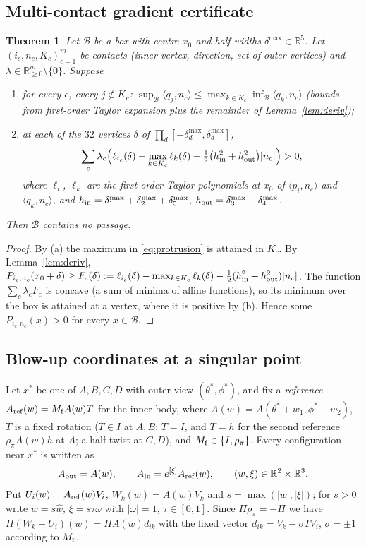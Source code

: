 \documentclass[11pt]{amsart}
\newtheorem{theorem}{Theorem}[section]
\theoremstyle{definition}
\newcommand{\R}{\mathbb{R}}
\newcommand{\Prj}{\Pi}
\newcommand{\ip}[2]{\langle #1,#2\rangle}
\newcommand{\abs}[1]{\lvert #1\rvert}
\begin{document}
\subsection{Multi-contact gradient certificate}
\begin{theorem}\label{thm:local5}
Let $\mathcal B$ be a box with centre $x_0$ and half-widths $\delta^{\max}\in\R^5$. Let $(i_c,n_c,K_c)_{c=1}^m$ be
contacts (inner vertex, direction, set of outer vertices) and $\lambda\in\R^m_{\ge0}\setminus\{0\}$. Suppose
\begin{enumerate}[label=(\alph*)]
\item for every $c$, every $j\notin K_c$: $\sup_{\mathcal B}\ip{q_j}{n_c}\le\max_{k\in K_c}\inf_{\mathcal B}\ip{q_k}{n_c}$
 (bounds from first-order Taylor expansion plus the remainder of Lemma~\ref{lem:deriv});
\item at each of the $32$ vertices $\delta$ of $\prod_d[-\delta^{\max}_d,\delta^{\max}_d]$,
\[
\sum_c\lambda_c\Bigl(\ell_{i_c}(\delta)-\max_{k\in K_c}\ell_{k}(\delta)-\tfrac12\bigl(h_{\rm in}^2+h_{\rm out}^2\bigr)\abs{n_c}\Bigr)>0,
\]
where $\ell_i$, $\ell_k$ are the first-order Taylor polynomials at $x_0$ of $\ip{p_i}{n_c}$ and $\ip{q_k}{n_c}$, and
$h_{\rm in}=\delta^{\max}_1+\delta^{\max}_2+\delta^{\max}_5$, $h_{\rm out}=\delta^{\max}_3+\delta^{\max}_4$.
\end{enumerate}
Then $\mathcal B$ contains no passage.
\end{theorem}
\begin{proof}
By (a) the maximum in \eqref{eq:protrusion} is attained in $K_c$. By Lemma~\ref{lem:deriv},
$P_{i_c,n_c}(x_0+\delta)\ge F_c(\delta):=\ell_{i_c}(\delta)-\max_{k\in K_c}\ell_k(\delta)-\tfrac12(h_{\rm in}^2+h_{\rm out}^2)\abs{n_c}$.
The function $\sum_c\lambda_cF_c$ is concave (a sum of minima of affine functions), so its minimum over the box is
attained at a vertex, where it is positive by (b). Hence some $P_{i_c,n_c}(x)>0$ for every $x\in\mathcal B$.
\end{proof}

\subsection{Blow-up coordinates at a singular point}
Let $x^*$ be one of $A,B,C,D$ with outer view $(\theta^*,\phi^*)$, and fix a \emph{reference} $A_{\rm ref}(w)=M_{\rm f}A(w)T$
for the inner body, where $A(w)=A(\theta^*+w_1,\phi^*+w_2)$, $T$ is a fixed rotation ($T\in I$ at $A,B$: $T=I$, and $T=h$ for the
second reference $\rho_\pi A(w)h$ at $A$; a half-twist at $C,D$), and $M_{\rm f}\in\{I,\rho_\pi\}$. Every configuration near $x^*$ is
written as
\[
A_{\rm out}=A(w),\qquad A_{\rm in}=e^{[\xi]}A_{\rm ref}(w),\qquad (w,\xi)\in\R^2\times\R^3 .
\]
Put $U_i(w)=A_{\rm ref}(w)V_i$, $W_k(w)=A(w)V_k$ and $s=\max(\abs w,\abs\xi)$; for $s>0$ write $w=s\hat w$, $\xi=s\tau\omega$
with $\abs\omega=1$, $\tau\in[0,1]$. Since $\Prj\rho_\pi=-\Prj$ we have $\Prj(W_k-U_i)(w)=\Prj A(w)d_{ik}$ with the fixed vector
$d_{ik}=V_k-\sigma TV_i$, $\sigma=\pm1$ according to $M_{\rm f}$.
\end{document}

